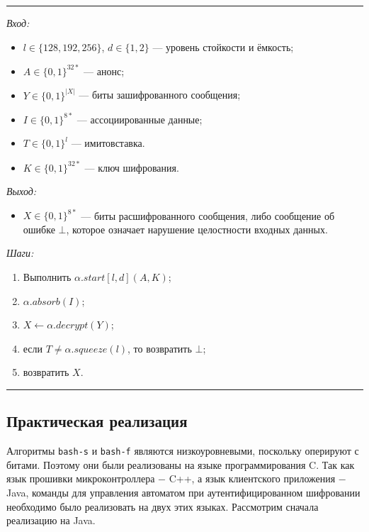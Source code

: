 	\noindent\rule{\textwidth}{1pt}
	
	\textit{Вход:}
	
	\begin{itemize}
		\item $l \in \{128, 192, 256\}$, $d \in \{1, 2\}$ --- уровень стойкости и ёмкость;
		\item $A \in \{0, 1\}^{32*}$ --- анонс;
		\item $Y \in \{0, 1\}^{|X|}$ --- биты зашифрованного сообщения;
		\item $I \in \{0, 1\}^{8*}$ --- ассоциированные данные;
		\item $T \in \{0, 1\}^l$ --- имитовставка.
		\item $K \in \{0, 1\}^{32*}$ --- ключ шифрования.
	\end{itemize}
	
	\textit{Выход:}
	
	\begin{itemize}
		\item $X \in \{0, 1\}^{8*}$ --- биты расшифрованного сообщения, либо сообщение об ошибке $\bot$,
		которое означает нарушение целостности входных данных.
	\end{itemize}
	
	\textit{Шаги:}
	
	\begin{enumerate}
		\item Выполнить $\alpha .start \left[l, d\right] \left(A, K\right)$;
		\item $\alpha .absorb \left(I\right)$;
		\item $X \leftarrow \alpha .decrypt \left(Y\right)$;
		\item если $T \neq \alpha .squeeze \left(l\right)$, то возвратить $\bot$;
		\item возвратить $X$.
	\end{enumerate}
	
	\noindent\rule{\textwidth}{1pt}
	
	\subsection{Практическая реализация}
	
	Алгоритмы \texttt{bash-s} и \texttt{bash-f} являются низкоуровневыми, поскольку оперируют с битами. Поэтому они 
	были реализованы на языке программирования C. Так как язык прошивки микроконтроллера $-$ C++,
	а язык клиентского приложения $-$ Java, команды для управления автоматом при аутентифицированном 
	шифровании необходимо было реализовать на двух этих языках. Рассмотрим сначала реализацию на Java.
	
